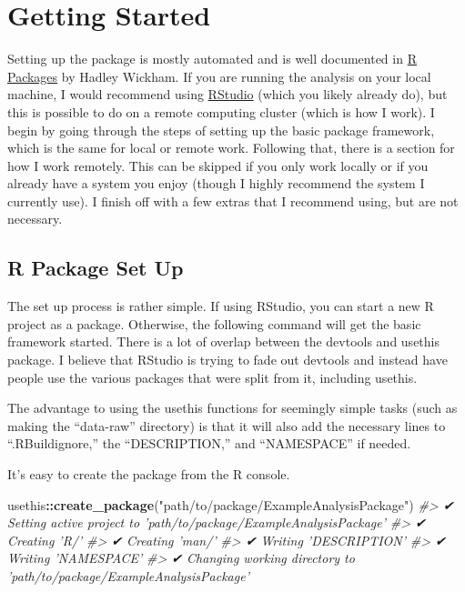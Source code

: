 \documentclass[]{book}
\newenvironment{Shaded}{\begin{snugshade}}{\end{snugshade}}
\newcommand{\KeywordTok}[1]{\textcolor[rgb]{0.13,0.29,0.53}{\textbf{#1}}}
\newcommand{\StringTok}[1]{\textcolor[rgb]{0.31,0.60,0.02}{#1}}
\newcommand{\CommentTok}[1]{\textcolor[rgb]{0.56,0.35,0.01}{\textit{#1}}}
\newcommand{\OperatorTok}[1]{\textcolor[rgb]{0.81,0.36,0.00}{\textbf{#1}}}
\newcommand{\NormalTok}[1]{#1}
\begin{document}
\chapter{Getting Started}\label{getting-started}

Setting up the package is mostly automated and is well documented in
\href{https://r-pkgs.org/index.html}{R Packages} by Hadley Wickham. If
you are running the analysis on your local machine, I would recommend
using \href{https://www.rstudio.com}{RStudio} (which you likely already
do), but this is possible to do on a remote computing cluster (which is
how I work). I begin by going through the steps of setting up the basic
package framework, which is the same for local or remote work. Following
that, there is a section for how I work remotely. This can be skipped if
you only work locally or if you already have a system you enjoy (though
I highly recommend the system I currently use). I finish off with a few
extras that I recommend using, but are not necessary.

\section{R Package Set Up}\label{r-package-set-up}

The set up process is rather simple. If using RStudio, you can start a
new R project as a package. Otherwise, the following command will get
the basic framework started. There is a lot of overlap between the
devtools and usethis package. I believe that RStudio is trying to fade
out devtools and instead have people use the various packages that were
split from it, including usethis.

The advantage to using the usethis functions for seemingly simple tasks
(such as making the ``data-raw'' directory) is that it will also add the
necessary lines to ``.RBuildignore,'' the ``DESCRIPTION,'' and
``NAMESPACE'' if needed.

It's easy to create the package from the R console.

\begin{Shaded}
\begin{Highlighting}[]
\NormalTok{usethis}\OperatorTok{::}\KeywordTok{create_package}\NormalTok{(}\StringTok{"path/to/package/ExampleAnalysisPackage"}\NormalTok{)}
\CommentTok{#> ✔ Setting active project to 'path/to/package/ExampleAnalysisPackage'}
\CommentTok{#> ✔ Creating 'R/'}
\CommentTok{#> ✔ Creating 'man/'}
\CommentTok{#> ✔ Writing 'DESCRIPTION'}
\CommentTok{#> ✔ Writing 'NAMESPACE'}
\CommentTok{#> ✔ Changing working directory to 'path/to/package/ExampleAnalysisPackage'}
\end{Highlighting}
\end{Shaded}
\end{document}
